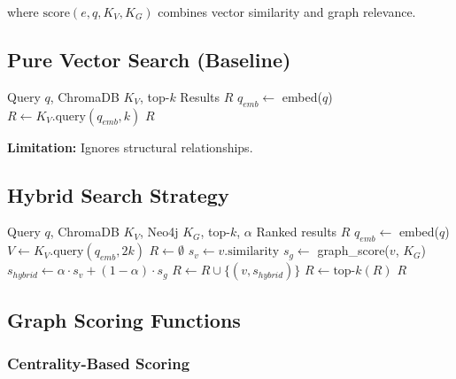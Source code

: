 \documentclass[11pt,letterpaper]{article}
\begin{document}
where $\text{score}(e, q, K_V, K_G)$ combines vector similarity and graph relevance.

\subsection{Pure Vector Search (Baseline)}

\begin{algorithm}
\caption{Pure Vector Search}
\begin{algorithmic}[1]
\REQUIRE Query $q$, ChromaDB $K_V$, top-$k$
\ENSURE Results $R$
\STATE $q_{emb} \gets$ embed($q$) 
\STATE $R \gets K_V.\text{query}(q_{emb}, k)$ 
\RETURN $R$
\end{algorithmic}
\end{algorithm}

\textbf{Limitation:} Ignores structural relationships.

\subsection{Hybrid Search Strategy}

\begin{algorithm}
\caption{Graph-Enriched Hybrid Search}
\begin{algorithmic}[1]
\REQUIRE Query $q$, ChromaDB $K_V$, Neo4j $K_G$, top-$k$, $\alpha$
\ENSURE Ranked results $R$
\STATE $q_{emb} \gets$ embed($q$)
\STATE $V \gets K_V.\text{query}(q_{emb}, 2k)$ 
\STATE $R \gets \emptyset$
    \STATE $s_v \gets v.\text{similarity}$ 
    \STATE $s_g \gets$ graph\_score($v$, $K_G$) 
    \STATE $s_{hybrid} \gets \alpha \cdot s_v + (1-\alpha) \cdot s_g$
    \STATE $R \gets R \cup \{(v, s_{hybrid})\}$
\ENDFOR
\STATE $R \gets \text{top-}k(R)$ 
\RETURN $R$
\end{algorithmic}
\end{algorithm}

\subsection{Graph Scoring Functions}

\subsubsection{Centrality-Based Scoring}
\end{document}
